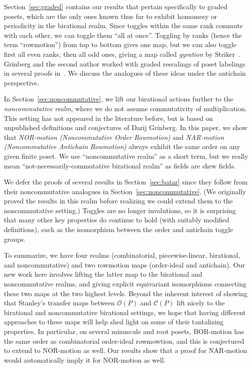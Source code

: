 \documentclass[10pt]{amsart}
\theoremstyle{definition}
\newcommand{\calc}{\mathcal{C}}
\newcommand{\calo}{\mathcal{O}}
\begin{document}
Section~\ref{sec:graded} contains our results that pertain specifically to graded
posets, which are the only ones known thus far to exhibit homomesy or periodicity in the birational realm. 
Since toggles within the same rank commute with each other, we can toggle them ``all at
once''. Toggling by ranks (hence the term ``rowmotion'') from top to bottom gives one map,
but we can also toggle first all even ranks, then all odd ones, giving a map
called \textit{gyration} by Striker~\cite{strikerRS}. 
Grinberg and the second author worked with graded rescalings of
poset labelings in several proofs in~\cite{GrRo15,GrRo16}.
We discuss the analogues of these ideas under the antichain perspective.

In Section~\ref{sec:noncommutative}, we lift our birational actions
further to the \emph{noncommutative realm}, where we do not assume commutativity
of multiplication. This setting has not appeared in the literature before, but is based on
unpublished definitions and conjectures of Darij Grinberg. 
In this paper, we show that \emph{NOR-motion (Noncommutative Order Rowmotion)} and
\emph{NAR-motion (Noncommutative Antichain Rowmotion)} 
always exhibit the same order on any given finite poset.
We use ``noncommutative realm'' as a short term, but we really mean
``not-necessarily-commutative birational realm'' as fields are skew fields. 

We defer the proofs of several results in Section~\ref{sec:batar} since they follow from their
noncommutative analogues in Section~\ref{sec:noncommutative}. 
(We originally proved the results in this realm before realizing we could extend
them to the noncommutative setting.) 
Toggles are no longer involutions, so it is surprising that many other key properties do continue to hold
(with suitably modified definitions), such as
the isomorphism between the order and antichain toggle groups. 

To summarize, we have four realms (combinatorial, piecewise-linear, birational, and
noncommutative) and two rowmotion maps (order-ideal and antichain). Our new work here
involves lifting the latter map to the birational and noncommutative realms, and giving
explicit equivariant isomorphisms connecting these two maps at the two highest levels. 
Beyond the inherent interest of showing that Stanley's transfer maps between $\calo (P)$ and
$\calc (P)$ lift nicely to the birational and noncommutative birational settings, we hope
that having different approaches to these maps will help shed light on some of their
tantalizing properties. In particular, on several minuscule and root posets, BOR-motion has
the same order as combinatorial
order-ideal rowmowtion, and this is conjectured to extend to NOR-motion as well. Our
results show that a proof for NAR-motion would automatically imply it for NOR-motion as
well. 
\end{document}
